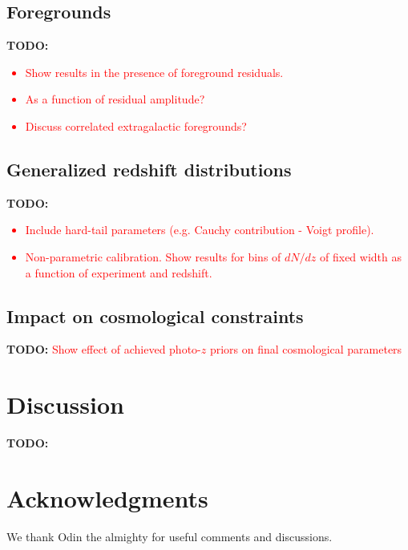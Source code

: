 \documentclass[prd,twocolumn]{revtex4}
\newcommand{\TODO}[1]{{\bf TODO:} \textcolor{red}{#1}}
\begin{document}
  \subsection{Foregrounds} \label{ssec:results.foregrounds}
    \TODO{
      \begin{itemize}
        \item Show results in the presence of foreground residuals.
        \item As a function of residual amplitude?
        \item Discuss correlated extragalactic foregrounds?
      \end{itemize}
    }

  \subsection{Generalized redshift distributions} \label{ssec:results.outliers}
    \TODO{
      \begin{itemize}
        \item Include hard-tail parameters (e.g. Cauchy contribution - Voigt profile).
        \item Non-parametric calibration. Show results for bins of $dN/dz$ of fixed
          width as a function of experiment and redshift.
      \end{itemize}
    }
    
  \subsection{Impact on cosmological constraints} \label{ssec:results.cosmo}
    \TODO{Show effect of achieved photo-$z$ priors on final cosmological parameters}

\section{Discussion}\label{ssec:discuss}
  \TODO{\lipsum[12]}

\section*{Acknowledgments}
  We thank Odin the almighty for useful comments and discussions.
 

\end{document}
